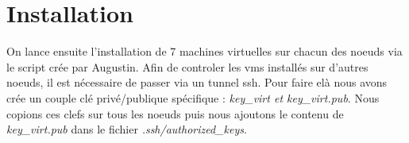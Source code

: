 \documentclass{article}
\begin{document}
\section{Installation}
On lance ensuite l'installation de 7 machines virtuelles sur chacun des noeuds via le script crée par Augustin.
Afin de controler les vms installés sur d'autres noeuds, il est nécessaire de passer via un tunnel ssh. Pour faire elà nous avons crée un couple clé privé/publique spécifique : \emph{key\_virt et key\_virt.pub}. Nous copions ces clefs sur tous les noeuds puis nous ajoutons le contenu de \emph{key\_virt.pub} dans le fichier \emph{.ssh/authorized\_keys}.

\section{}
\end{document}
